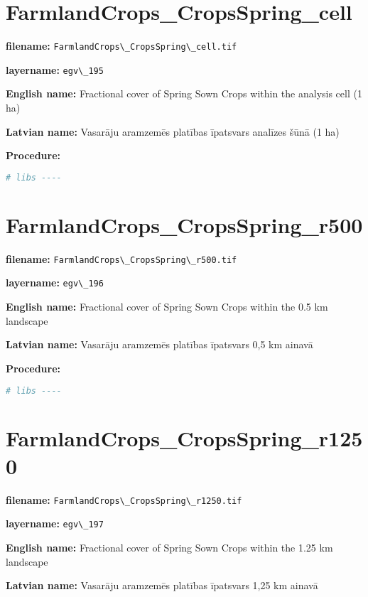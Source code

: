 \documentclass[
]{book}
\newcommand{\passthrough}[1]{#1}
\begin{document}
\section{FarmlandCrops\_CropsSpring\_cell}\label{ch06.195}

\textbf{filename:} \passthrough{\lstinline!FarmlandCrops\_CropsSpring\_cell.tif!}

\textbf{layername:} \passthrough{\lstinline!egv\_195!}

\textbf{English name:} Fractional cover of Spring Sown Crops within the analysis cell (1 ha)

\textbf{Latvian name:} Vasarāju aramzemēs platības īpatsvars analīzes šūnā (1 ha)

\textbf{Procedure:}

\begin{lstlisting}[language=R]
# libs ----
\end{lstlisting}

\section{FarmlandCrops\_CropsSpring\_r500}\label{ch06.196}

\textbf{filename:} \passthrough{\lstinline!FarmlandCrops\_CropsSpring\_r500.tif!}

\textbf{layername:} \passthrough{\lstinline!egv\_196!}

\textbf{English name:} Fractional cover of Spring Sown Crops within the 0.5 km landscape

\textbf{Latvian name:} Vasarāju aramzemēs platības īpatsvars 0,5 km ainavā

\textbf{Procedure:}

\begin{lstlisting}[language=R]
# libs ----
\end{lstlisting}

\section{FarmlandCrops\_CropsSpring\_r1250}\label{ch06.197}

\textbf{filename:} \passthrough{\lstinline!FarmlandCrops\_CropsSpring\_r1250.tif!}

\textbf{layername:} \passthrough{\lstinline!egv\_197!}

\textbf{English name:} Fractional cover of Spring Sown Crops within the 1.25 km landscape

\textbf{Latvian name:} Vasarāju aramzemēs platības īpatsvars 1,25 km ainavā
\end{document}
